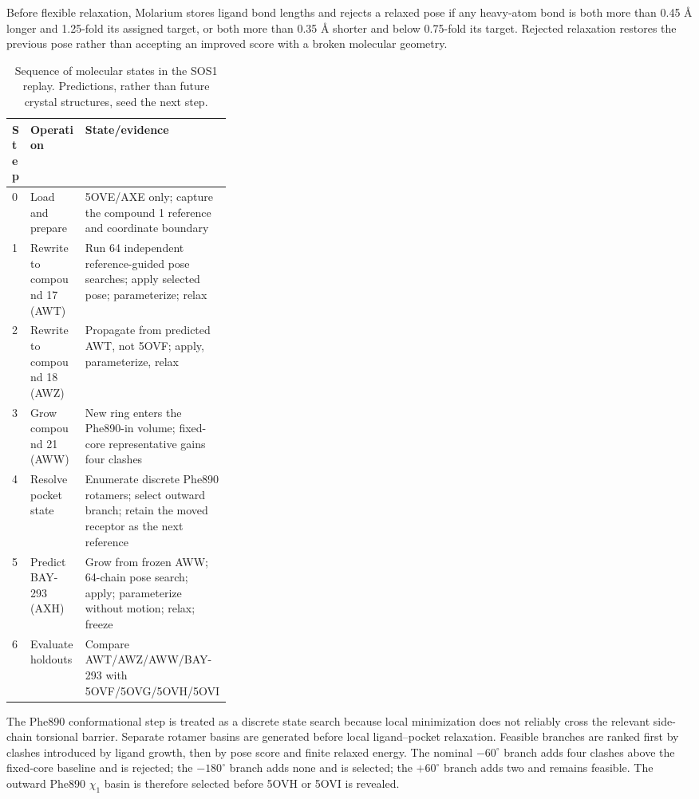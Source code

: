 \documentclass[11pt]{article}
\begin{document}
\begin{small}
Before flexible relaxation, Molarium stores ligand bond lengths and rejects a relaxed pose if any heavy-atom bond is both more than 0.45 \AA{} longer and 1.25-fold its assigned target, or both more than 0.35 \AA{} shorter and below 0.75-fold its target. Rejected relaxation restores the previous pose rather than accepting an improved score with a broken molecular geometry.

\begin{table}[htbp]
\centering\small
\caption{Sequence of molecular states in the SOS1 replay. Predictions, rather than future crystal structures, seed the next step.}
\label{tab:appA_sos1_beats}
\begin{tabularx}{\linewidth}{@{}p{0.07\linewidth}p{0.25\linewidth}X@{}}
\toprule
\textbf{Step} & \textbf{Operation} & \textbf{State/evidence}\\
\midrule
0 & Load and prepare & 5OVE/AXE only; capture the compound 1 reference and coordinate boundary\\
1 & Rewrite to compound 17 (AWT) & Run 64 independent reference-guided pose searches; apply selected pose; parameterize; relax\\
2 & Rewrite to compound 18 (AWZ) & Propagate from predicted AWT, not 5OVF; apply, parameterize, relax\\
3 & Grow compound 21 (AWW) & New ring enters the Phe890-in volume; fixed-core representative gains four clashes\\
4 & Resolve pocket state & Enumerate discrete Phe890 rotamers; select outward branch; retain the moved receptor as the next reference\\
5 & Predict BAY-293 (AXH) & Grow from frozen AWW; 64-chain pose search; apply; parameterize without motion; relax; freeze\\
6 & Evaluate holdouts & Compare AWT/AWZ/AWW/BAY-293 with 5OVF/5OVG/5OVH/5OVI\\
\bottomrule
\end{tabularx}
\end{table}

The Phe890 conformational step is treated as a discrete state search because local minimization does not reliably cross the relevant side-chain torsional barrier. Separate rotamer basins are generated before local ligand--pocket relaxation. Feasible branches are ranked first by clashes introduced by ligand growth, then by pose score and finite relaxed energy. The nominal $-60^{\circ}$ branch adds four clashes above the fixed-core baseline and is rejected; the $-180^{\circ}$ branch adds none and is selected; the $+60^{\circ}$ branch adds two and remains feasible. The outward Phe890 $\chi_1$ basin is therefore selected before 5OVH or 5OVI is revealed.


\end{small}
\end{document}

